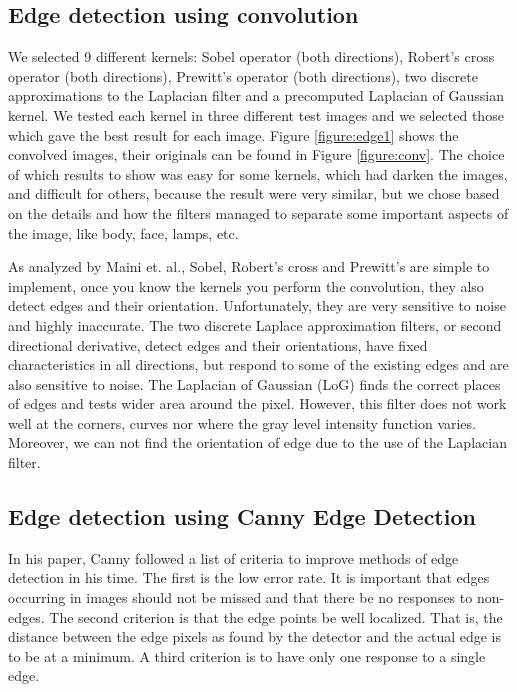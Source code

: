 \documentclass[]{IEEEtran}
\begin{document}
  \subsection{Edge detection using convolution}
  We selected 9 different kernels: Sobel operator (both directions), Robert's cross operator (both directions), Prewitt's operator (both directions), two discrete approximations to the Laplacian filter and a precomputed Laplacian of Gaussian kernel. We tested each kernel in three different test images and we selected those which gave the best result for each image. Figure \ref{figure:edge1} shows the convolved images, their originals can be found in Figure \ref{figure:conv}. The choice of which results to show was easy for some kernels, which had darken the images, and difficult for others, because the result were very similar, but we chose based on the details and how the filters managed to separate some important aspects of the image, like body, face, lamps, etc.
  
  As analyzed by Maini et. al.\cite{b4}, Sobel, Robert's cross and Prewitt's are simple to implement, once you know the kernels you perform the convolution, they also detect edges and their orientation. Unfortunately, they are very sensitive to noise and highly inaccurate. The two discrete Laplace approximation filters, or second directional derivative, detect edges and their orientations, have fixed characteristics in all directions, but respond to some of the existing edges and are also sensitive to noise.
  The Laplacian of Gaussian (LoG) finds the correct places of edges and tests wider area around the pixel. However, this filter does not work well at the corners, curves nor where the gray level intensity function varies. Moreover, we can not find the orientation of edge due to the use of the Laplacian filter.
  
  \subsection{Edge detection using Canny Edge Detection}
  In his paper, Canny followed a list of criteria to improve methods of edge detection in his time. The first is the low error rate. It is important that edges occurring in images should not be missed and that there be no responses to non-edges. The second criterion is that the edge points be well localized. That is, the distance between the edge pixels as found by the detector and the actual edge is to be at a minimum. A third criterion is to have only one response to a single edge\cite{b4}.
  
\end{document}
